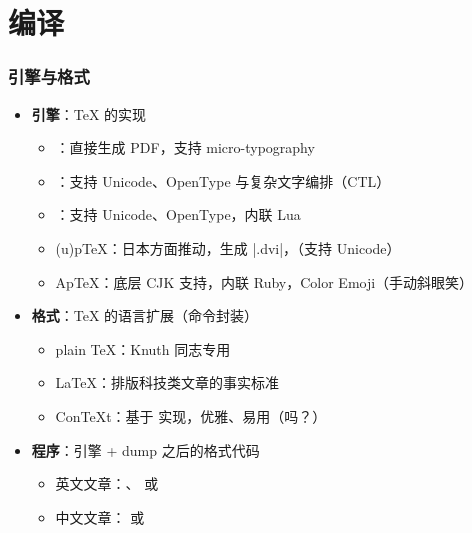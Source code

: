 \section{编译}

\begin{frame}[fragile]
  \frametitle{引擎与格式}
  \begin{itemize}
    \item<+-> \textbf{引擎}：\TeX{} 的实现

      \begin{itemize}
        \item \pdfTeX{}：直接生成 PDF，支持 micro-typography
        \item \XeTeX{}：支持 Unicode、OpenType 与复杂文字编排（CTL）
        \item \LuaTeX{}：支持 Unicode、OpenType，内联 Lua
        \item (u)p\TeX{}：日本方面推动，生成 |.dvi|，（支持 Unicode）
        \item Ap\TeX{}：底层 CJK 支持，内联 Ruby，Color Emoji（手动斜眼笑）
      \end{itemize}

    \item<+-> \textbf{格式}：\TeX{} 的语言扩展（命令封装）

      \begin{itemize}
        \item plain \TeX{}：Knuth 同志专用
        \item \LaTeX{}：排版科技类文章的事实标准
        \item Con\TeX t：基于 \LuaTeX{} 实现，优雅、易用（吗？）
      \end{itemize}

    \item<+-> \textbf{程序}：引擎 + dump 之后的格式代码

      \begin{itemize}
        \item \alert{英文文章：\pdfLaTeX{}、\XeLaTeX{} 或 \LuaLaTeX{}}
        \item \alert{中文文章：\XeLaTeX{} 或 \LuaLaTeX{}}
      \end{itemize}
  \end{itemize}
\end{frame}


